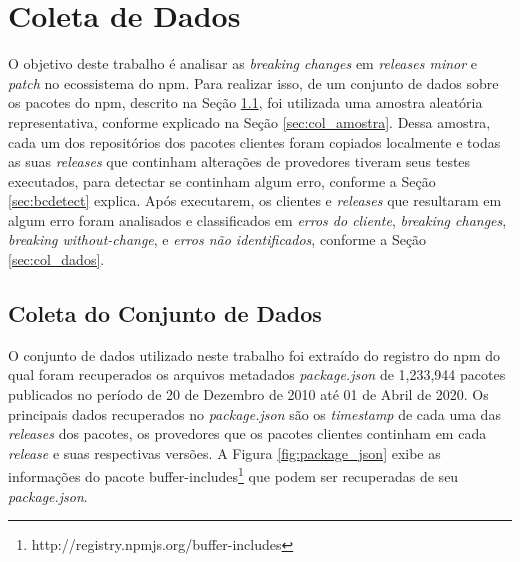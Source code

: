 \chapter{Coleta de Dados}
\label{cap:metodologia}

O objetivo deste trabalho é analisar as \textit{breaking changes} em \textit{releases minor} e \textit{patch} no ecossistema do \textsf{npm}. Para realizar isso, de um conjunto de dados sobre os pacotes do \textsf{npm}, descrito na Seção \ref{sec:col_base}, foi utilizada uma amostra aleatória representativa, conforme explicado na Seção \ref{sec:col_amostra}. Dessa amostra, cada um dos repositórios dos pacotes clientes foram copiados localmente e todas as suas \textit{releases} que continham alterações de provedores tiveram seus testes executados, para detectar se continham algum erro, conforme a Seção \ref{sec:bcdetect} explica. Após executarem, os clientes e \textit{releases} que resultaram em algum erro foram analisados e classificados em \textit{erros do cliente}, \textit{breaking changes}, \textit{breaking without-change}, e \textit{erros não identificados}, conforme a Seção \ref{sec:col_dados}.

\section{Coleta do Conjunto de Dados}
\label{sec:col_base}
O conjunto de dados utilizado neste trabalho foi extraído do registro do \textsf{npm} do qual foram recuperados os arquivos metadados \textit{package.json} de 1,233,944 pacotes publicados no período de 20 de Dezembro de 2010 até 01 de Abril de 2020. Os principais dados recuperados no \textit{package.json} são os \textit{timestamp} de cada uma das \textit{releases} dos pacotes, os provedores que os pacotes clientes continham em cada \textit{release} e suas respectivas versões. A Figura \ref{fig:package_json} exibe as informações do pacote \textsf{buffer-includes}\footnote{http://registry.npmjs.org/buffer-includes} que podem ser recuperadas de seu \textit{package.json}.

